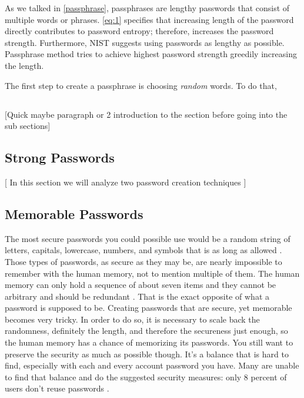 \documentclass[acmsmall,nonacm]{acmart}
\begin{document}
As we talked in \autoref{passphrase}, passphrases are lengthy passwords that consist of multiple words or phrases. \autoref{eq:1} specifies that increasing length of the password directly contributes to password entropy; therefore, increases the password strength. Furthermore, NIST suggests using passwords as lengthy as possible. Passphrase method tries to achieve highest password strength greedily increasing the length.

The first step to create a passphrase is choosing \emph{random} words. To do that,


\subsection{}

\textcolor{beaver}{[Quick maybe paragraph or 2 introduction to the section before going into the sub sections]}

\subsection{Strong Passwords}

\textcolor{beaver}{[ In this section we will analyze two password creation techniques ]}

\subsection{Memorable Passwords}


The most secure passwords you could possible use would be a random string of letters, capitals, lowercase, numbers, and symbols that is as long as allowed \cite{lee_2014}. Those types of passwords, as secure as they may be, are nearly impossible to remember with the human memory, not to mention multiple of them. The human memory can only hold a sequence of about seven items and they cannot be arbitrary and should be redundant \cite{yan_2000}. That is the exact opposite of what a password is supposed to be. Creating passwords that are secure, yet memorable becomes very tricky. In order to do so, it is necessary to scale back the randomness, definitely the length, and therefore the secureness just enough, so the human memory has a chance of memorizing its passwords. You still want to preserve the security as much as possible though. It’s a balance that is hard to find, especially with each and every account password you have. Many are unable to find that balance and do the suggested security measures: only 8 percent of users don’t reuse passwords \cite{lee_2014}.
\end{document}

